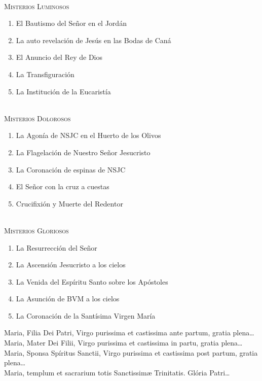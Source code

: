 \documentclass[9pt]{article}
\begin{document}
\begin{multicols*}{2}
    \small{}\\
    \textsc{Misterios Luminosos}
    \begin{enumerate}
        \item El Bautismo del Señor en el Jordán
        \item La auto revelación de Jesús en las Bodas de Caná
        \item El Anuncio del Rey de Dios
        \item La Transfiguración
        \item La Institución de la Eucaristía
    \end{enumerate}

    \small{}\\
    \textsc{Misterios Dolorosos}
    \begin{enumerate}
        \item La Agonía de NSJC en el Huerto de los Olivos
        \item La Flagelación de Nuestro Señor Jesucristo
        \item La Coronación de espinas de NSJC
        \item El Señor con la cruz a cuestas
        \item Crucifixión y Muerte del Redentor
    \end{enumerate}

    \small{}\\
    \textsc{Misterios Gloriosos}
    \begin{enumerate}
        \item La Resurrección del Señor
        \item La Ascensión Jesucristo a los cielos
        \item La Venida del Espíritu Santo sobre los Apóstoles
        \item La Asunción de BVM a los cielos
        \item La Coronación de la Santísima Virgen María
    \end{enumerate}

    \bigskip

     Maria, Filia Dei Patri, Virgo purissima et castissima ante partum, gratia plena{\ldots}\\
     Maria, Mater Dei Filii, Virgo purissima et castissima in partu, gratia plena{\ldots}\\
     Maria, Sponsa Spíritus Sanctii, Virgo purissima et castissima post partum, gratia plena{\ldots}\\
     Maria, templum et sacrarium totis Sanctissimæ Trinitatis. Glória Patri{\ldots}


\end{multicols*}
\end{document}
